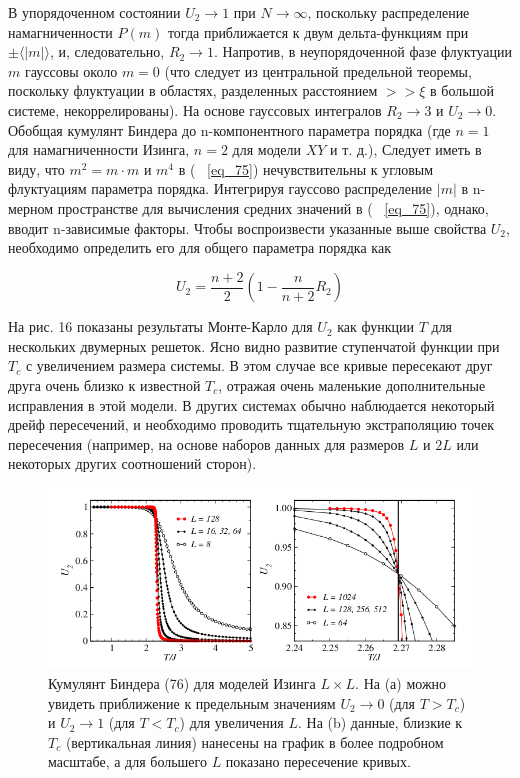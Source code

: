 \documentclass[11pt]{article}
\begin{document}
В упорядоченном состоянии $U_2 → 1$ при $N \to \infty$, поскольку распределение намагниченности $P(m)$ тогда приближается к двум дельта-функциям при $\pm \langle |m| \rangle $, и, следовательно, $R_2 \to 1$. Напротив, в неупорядоченной фазе флуктуации $m$ гауссовы около $m = 0$ (что следует из центральной предельной теоремы, поскольку флуктуации в областях, разделенных расстоянием $>>\xi$ в большой системе, некоррелированы). На основе гауссовых интегралов $R_2 \to 3$ и $U_2 \to 0$.
Обобщая кумулянт Биндера до n-компонентного параметра порядка (где $n = 1$ для намагниченности Изинга, $n = 2$ для модели $XY$ и т. д.), Следует иметь в виду, что $m^2 = m · m$ и $m^4$ в ( ~\ref{eq_75}) нечувствительны к угловым флуктуациям параметра порядка. Интегрируя гауссово распределение $|m|$ в n-мерном пространстве для вычисления средних значений в ( ~\ref{eq_75}), однако, вводит n-зависимые факторы. Чтобы воспроизвести указанные выше свойства $U_2$, необходимо определить его для общего параметра порядка как

\begin{equation}
U_2 = \frac{n+2}{2}(1-\frac{n}{ n+2 } R_2)
\label{eq_77}
\end{equation}

На рис. 16 показаны результаты Монте-Карло для $U_2$ как функции $T$ для нескольких двумерных решеток. Ясно видно развитие ступенчатой функции при $T_c$ с увеличением размера системы. В этом случае все кривые пересекают друг друга очень близко к известной $T_c$, отражая очень маленькие дополнительные исправления в этой модели. В других системах обычно наблюдается некоторый дрейф пересечений, и необходимо проводить тщательную экстраполяцию точек пересечения (например, на основе наборов данных для размеров $L$ и $2L$ или некоторых других соотношений сторон).

\begin{figure}[htp]
\centering
\includegraphics[scale=0.5]{fig16}
\caption{Кумулянт Биндера (76) для моделей Изинга $L × L$. На (а) можно увидеть приближение к предельным значениям $U_2 → 0$ (для $T> T_c$) и $U_2 → 1$ (для $T <T_c$) для увеличения $L$. На (b) данные, близкие к $T_c$ (вертикальная линия) нанесены на график в более подробном масштабе, а для большего $L$ показано пересечение кривых.}
\label{}
\end{figure}
\end{document}
